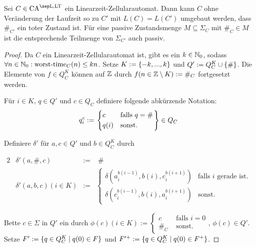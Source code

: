 \begin{satz}
    \label{satzRauteTot}
    Sei $C \in \CAM{\CALeft, \CALT}$ ein Linearzeit-Zellularautomat.
    Dann kann $C$ ohne Veränderung der Laufzeit so zu $C'$ mit $L(C) = L(C')$ umgebaut werden, dass $\#_{C'}$ ein toter Zustand ist.
    Für eine passive Zustandsmenge $M \subseteq \Sigma_C$ mit $\#_C \in M$ ist
    die entsprechende Teilmenge von $\Sigma_{C'}$ auch passiv.
\end{satz}
\begin{proof}
    Da $C$ ein Linearzeit-Zellularautomat ist, gibt
    es ein $k \in \mathbb{N}_0$, sodass $\forall n \in \mathbb{N}_0: \operatorname{worst-time}_C(n) \leq kn$.
    Setze $K := \{ {-k, ..., k} \}$ und  $Q' := Q_C^K \cup \{ { \# } \}$.
    Die Elemente von $f \in Q_C^K$ können auf $\mathbb{Z}$ durch $f(n \in \mathbb{Z} \setminus K) := \#_C$ fortgesetzt werden.

    Für $i \in K$, $q \in Q'$ und $c \in Q_C$ definiere folgende abkürzende Notation:
    \[
        q_i^c :=
        \begin{rcases}
            \begin{dcases}
                c & \text{falls } q = \# \\
                q(i) & \text{sonst.}
            \end{dcases}
        \end{rcases}
        \in Q_C
    \]

    Definiere $\delta'$ für $a, c \in Q'$ und $b \in Q^K_C$ durch
    
    \begin{alignat*}{2}
        & \delta'(a, \#, c) & := & \; \# \\
        & \delta'(a, b, c)(i \in K) & := &
        \begin{cases}
            \delta(a_i^{b(i - 1)}, b(i), c_i^{b(i + 1)}) & \text{falls } i \text{ gerade ist.} \\
            \delta(c_i^{b(i - 1)}, b(i), a_i^{b(i + 1)}) & \text{sonst.}
        \end{cases}
    \end{alignat*}
    
    Bette $c \in \Sigma$ in $Q'$ ein durch $\phi(c)(i \in K) := \begin{cases} c & \text{ falls } i = 0 \\ \#_C & \text { sonst.} \end{cases}$, $\phi(c) \in Q'$.
    Setze $F' := \{ { q \in Q_C^K } \; | \; { q(0) \in F } \}$
    und $F'^+ := \{ { q \in Q_C^K } \; | \; { q(0) \in F^+ } \}$.
    

\end{proof}
